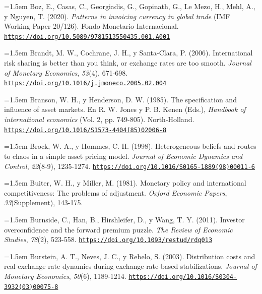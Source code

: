 \documentclass[10pt,a4paper]{article}
\begin{document}
\noindent\hangindent=1.5em Boz, E., Casas, C., Georgiadis, G., Gopinath, G., Le Mezo, H., Mehl, A., y Nguyen, T. (2020). \textit{Patterns in invoicing currency in global trade} (IMF Working Paper 20/126). Fondo Monetario Internacional. \href{https://doi.org/10.5089/9781513550435.001.A001}{\nolinkurl{https://doi.org/10.5089/9781513550435.001.A001}}

\noindent\hangindent=1.5em Brandt, M. W., Cochrane, J. H., y Santa-Clara, P. (2006). International risk sharing is better than you think, or exchange rates are too smooth. \textit{Journal of Monetary Economics}, \textit{53}(4), 671-698. \href{https://doi.org/10.1016/j.jmoneco.2005.02.004}{\nolinkurl{https://doi.org/10.1016/j.jmoneco.2005.02.004}}

\noindent\hangindent=1.5em Branson, W. H., y Henderson, D. W. (1985). The specification and influence of asset markets. En R. W. Jones y P. B. Kenen (Eds.), \textit{Handbook of international economics} (Vol. 2, pp. 749-805). North-Holland. \href{https://doi.org/10.1016/S1573-4404(85)02006-8}{\nolinkurl{https://doi.org/10.1016/S1573-4404(85)02006-8}}

\noindent\hangindent=1.5em Brock, W. A., y Hommes, C. H. (1998). Heterogeneous beliefs and routes to chaos in a simple asset pricing model. \textit{Journal of Economic Dynamics and Control}, \textit{22}(8-9), 1235-1274. \href{https://doi.org/10.1016/S0165-1889(98)00011-6}{\nolinkurl{https://doi.org/10.1016/S0165-1889(98)00011-6}}

\noindent\hangindent=1.5em Buiter, W. H., y Miller, M. (1981). Monetary policy and international competitiveness: The problems of adjustment. \textit{Oxford Economic Papers}, \textit{33}(Supplement), 143-175.

\noindent\hangindent=1.5em Burnside, C., Han, B., Hirshleifer, D., y Wang, T. Y. (2011). Investor overconfidence and the forward premium puzzle. \textit{The Review of Economic Studies}, \textit{78}(2), 523-558. \href{https://doi.org/10.1093/restud/rdq013}{\nolinkurl{https://doi.org/10.1093/restud/rdq013}}

\begin{sloppypar}\noindent\hangindent=1.5em Burstein, A. T., Neves, J. C., y Rebelo, S. (2003). Distribution costs and real exchange rate dynamics during exchange-rate-based stabilizations. \textit{Journal of Monetary Economics}, \textit{50}(6), 1189-1214. \href{https://doi.org/10.1016/S0304-3932(03)00075-8}{\nolinkurl{https://doi.org/10.1016/S0304-3932(03)00075-8}}\end{sloppypar}
\end{document}
